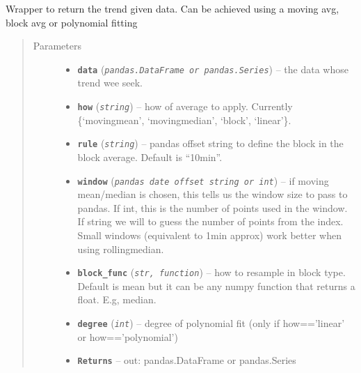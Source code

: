 \documentclass[a4paper,10pt,oneside]{sphinxmanual}
\begin{document}
\begin{fulllineitems}
\label{pymicra:pymicra.data.trend}
Wrapper to return the trend given data. Can be achieved using a moving avg, block avg or polynomial fitting
\begin{quote}\begin{description}
\item[{Parameters}] \leavevmode\begin{itemize}
\item {} 
\textbf{\texttt{data}} (\emph{\texttt{pandas.DataFrame or pandas.Series}}) -- the data whose trend wee seek.

\item {} 
\textbf{\texttt{how}} (\emph{\texttt{string}}) -- how of average to apply. Currently \{`movingmean', `movingmedian', `block', `linear'\}.

\item {} 
\textbf{\texttt{rule}} (\emph{\texttt{string}}) -- pandas offset string to define the block in the block average. Default is ``10min''.

\item {} 
\textbf{\texttt{window}} (\emph{\texttt{pandas date offset string or int}}) -- if moving mean/median is chosen, this tells us the window size to pass to pandas. If int,
this is the number of points used in the window. If string we will to guess the number of
points from the index.
Small windows (equivalent to 1min approx) work better when using rollingmedian.

\item {} 
\textbf{\texttt{block\_func}} (\emph{\texttt{str, function}}) -- how to resample in block type. Default is mean but it can be any numpy function
that returns a float. E.g, median.

\item {} 
\textbf{\texttt{degree}} (\emph{\texttt{int}}) -- degree of polynomial fit (only if how=='linear' or how=='polynomial')

\item {} 
\textbf{\texttt{Returns}} -- out: pandas.DataFrame or pandas.Series

\end{itemize}

\end{description}\end{quote}

\end{fulllineitems}
\end{document}
